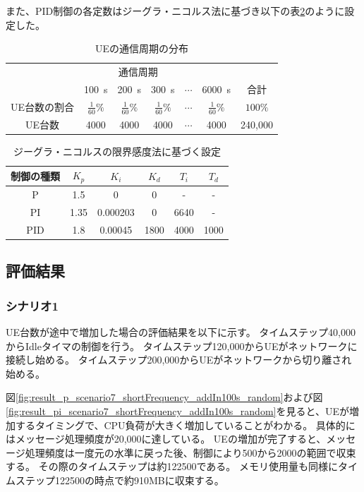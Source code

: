 \documentclass[a4j]{ujarticle}
\begin{document}
また、PID制御の各定数はジーグラ・ニコルス法に基づき以下の表\ref{table:Ziegler-Nichols_setting}のように設定した。
\begin{table}[htbp]
  \centering
  \caption{UEの通信周期の分布}
  \label{table:scenario7}
  \begin{tabular}{c|ccccc|c}
    \hline
    &\multicolumn{4}{c}{通信周期}& \\
    & 100~s & 200~s & 300~s & $\cdots$ & 6000~s & 合計\\\hline \hline
    UE台数の割合 & $\frac{1}{60}\%$ & $\frac{1}{60}\%$ & $\frac{1}{60}\%$ & $\cdots$ &$\frac{1}{60}\%$ & $100\%$ \\
    UE台数 & 4000 & 4000 & 4000 & $\cdots$ & 4000 & 240,000 \\\hline
  \end{tabular}
\end{table}
\begin{table}[]
  \centering
  \caption{ジーグラ・ニコルスの限界感度法に基づく設定}
  \label{table:Ziegler-Nichols_setting}
  \begin{tabular}{c|c|c|c|c|c}
    \hline
    制御の種類  & $K_p$ & $K_i$ & $K_d$ &$T_i$&$T_d$  \\\hline \hline
    P & 1.5 & 0 & 0 & - & - \\
    PI & 1.35 & 0.000203 & 0 & 6640 & -\\
    PID & 1.8 & 0.00045 & 1800 & 4000 & 1000 \\\hline
  \end{tabular}
\end{table}
\subsection{評価結果}

\subsubsection{シナリオ1}
UE台数が途中で増加した場合の評価結果を以下に示す。
タイムステップ40,000からIdleタイマの制御を行う。
タイムステップ120,000からUEがネットワークに接続し始める。
タイムステップ200,000からUEがネットワークから切り離され始める。

図\ref{fig:result_p_scenario7_shortFrequency_addIn100s_random}および図\ref{fig:result_pi_scenario7_shortFrequency_addIn100s_random}を見ると、UEが増加するタイミングで、CPU負荷が大きく増加していることがわかる。
具体的にはメッセージ処理頻度が20,000に達している。
UEの増加が完了すると、メッセージ処理頻度は一度元の水準に戻った後、制御により500から2000の範囲で収束する。
その際のタイムステップは約122500である。
メモリ使用量も同様にタイムステップ122500の時点で約910MBに収束する。
\end{document}
